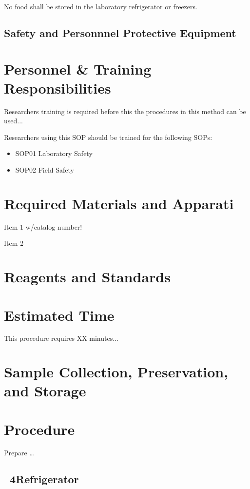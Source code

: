 \documentclass[12pt]{../SOP3_alpha}
\begin{document}
\NP No food shall be stored in the laboratory refrigerator or freezers.


\subsection*{Safety and Personnnel Protective Equipment}


\section{Personnel \& Training Responsibilities}

\NP Researchers training is required before this the procedures in this method can be used... 

\NP Researchers using this SOP should be trained for the following SOPs:

\begin{itemize}
  \item SOP01 Laboratory Safety
  \item SOP02 Field Safety
\end{itemize}

\section{Required Materials and Apparati}

\NP Item 1 w/catalog number!

\NP Item 2

\section{Reagents and Standards}

\section{Estimated Time}

\NP This procedure requires XX minutes...

\section{Sample Collection, Preservation, and Storage}

\section{Procedure}

\NP Prepare \dots
\subsection{~4\degree Refrigerator}
\end{document}

